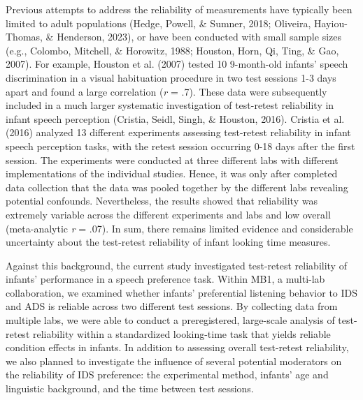 \documentclass[
  man,floatsintext]{apa6}
\begin{document}
Previous attempts to address the reliability of measurements have typically been limited to adult populations (Hedge, Powell, \& Sumner, 2018; Oliveira, Hayiou-Thomas, \& Henderson, 2023), or have been conducted with small sample sizes (e.g., Colombo, Mitchell, \& Horowitz, 1988; Houston, Horn, Qi, Ting, \& Gao, 2007).
For example, Houston et al. (2007) tested 10 9-month-old infants' speech discrimination in a visual habituation procedure in two test sessions 1-3 days apart and found a large correlation (\emph{r} = .7).
These data were subsequently included in a much larger systematic investigation of test-retest reliability in infant speech perception (Cristia, Seidl, Singh, \& Houston, 2016).
Cristia et al. (2016) analyzed 13 different experiments assessing test-retest reliability in infant speech perception tasks, with the retest session occurring 0-18 days after the first session.
The experiments were conducted at three different labs with different implementations of the individual studies.
Hence, it was only after completed data collection that the data was pooled together by the different labs revealing potential confounds.
Nevertheless, the results showed that reliability was extremely variable across the different experiments and labs and low overall (meta-analytic \emph{r} = .07).
In sum, there remains limited evidence and considerable uncertainty about the test-retest reliability of infant looking time measures.

Against this background, the current study investigated test-retest reliability of infants' performance in a speech preference task.
Within MB1, a multi-lab collaboration, we examined whether infants' preferential listening behavior to IDS and ADS is reliable across two different test sessions.
By collecting data from multiple labs, we were able to conduct a preregistered, large-scale analysis of test-retest reliability within a standardized looking-time task that yields reliable condition effects in infants.
In addition to assessing overall test-retest reliability, we also planned to investigate the influence of several potential moderators on the reliability of IDS preference: the experimental method, infants' age and linguistic background, and the time between test sessions.
\end{document}
